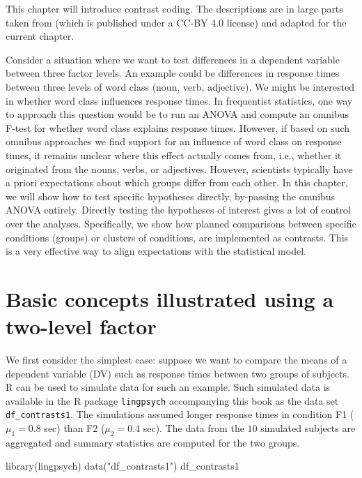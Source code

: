 \documentclass[
  12pt,
]{krantz}
\newenvironment{Shaded}{\begin{snugshade}}{\end{snugshade}}
\newcommand{\FunctionTok}[1]{\textcolor[rgb]{0.00,0.00,0.00}{#1}}
\newcommand{\NormalTok}[1]{#1}
\newcommand{\StringTok}[1]{\textcolor[rgb]{0.31,0.60,0.02}{#1}}
\theoremstyle{definition}
\theoremstyle{definition}
\theoremstyle{definition}
\theoremstyle{definition}
\theoremstyle{remark}
\begin{document}
This chapter will introduce contrast coding. The descriptions are in large parts taken from \citet{schad2020capitalize} (which is published under a CC-BY 4.0 license) and adapted for the current chapter.

Consider a situation where we want to test differences in a dependent variable between three factor levels. An example could be differences in response times between three levels of word class (noun, verb, adjective). We might be interested in whether word class influences response times. In frequentist statistics, one way to approach this question would be to run an ANOVA and compute an omnibus F-test for whether word class explains response times. However, if based on such omnibus approaches we find support for an influence of word class on response times, it remains unclear where this effect actually comes from, i.e., whether it originated from the nouns, verbs, or adjectives. However, scientists typically have a priori expectations about which groups differ from each other. In this chapter, we will show how to test specific hypotheses directly, by-passing the omnibus ANOVA entirely. Directly testing the hypotheses of interest gives a lot of control over the analyses. Specifically, we show how planned comparisons between specific conditions (groups) or clusters of conditions, are implemented as contrasts. This is a very effective way to align expectations with the statistical model.

\hypertarget{basic-concepts-illustrated-using-a-two-level-factor}{%
\section{Basic concepts illustrated using a two-level factor}\label{basic-concepts-illustrated-using-a-two-level-factor}}

We first consider the simplest case: suppose we want to compare the means of a dependent variable (DV) such as response times between two groups of subjects. R can be used to simulate data for such an example. Such simulated data is available in the R package \texttt{lingpsych} accompanying this book as the data set \texttt{df\_contrasts1}. The simulations assumed longer response times in condition F1 (\(\mu_1 = 0.8\) sec) than F2 (\(\mu_2 = 0.4\) sec). The data from the \(10\) simulated subjects are aggregated and summary statistics are computed for the two groups.

\begin{Shaded}
\begin{Highlighting}[]
\FunctionTok{library}\NormalTok{(lingpsych)}
\FunctionTok{data}\NormalTok{(}\StringTok{"df\_contrasts1"}\NormalTok{)}
\NormalTok{df\_contrasts1}
\end{Highlighting}
\end{Shaded}
\end{document}
